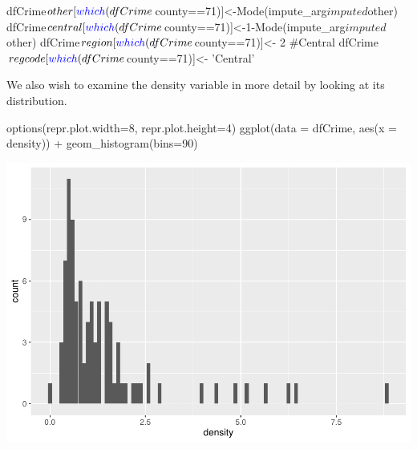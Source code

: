 \documentclass[]{article}
\newenvironment{Shaded}{}{}
\newcommand{\CommentTok}[1]{\textcolor[rgb]{0.00,0.50,0.00}{#1}}
\newcommand{\DataTypeTok}[1]{#1}
\newcommand{\DecValTok}[1]{#1}
\newcommand{\KeywordTok}[1]{\textcolor[rgb]{0.00,0.00,1.00}{#1}}
\newcommand{\NormalTok}[1]{#1}
\newcommand{\OperatorTok}[1]{#1}
\newcommand{\StringTok}[1]{\textcolor[rgb]{0.00,0.50,0.50}{#1}}
\begin{document}
\begin{Shaded}
\begin{Highlighting}[]
\NormalTok{dfCrime}\OperatorTok{$}\NormalTok{other[}\KeywordTok{which}\NormalTok{(dfCrime}\OperatorTok{$}\NormalTok{county}\OperatorTok{==}\DecValTok{71}\NormalTok{)]<-}\KeywordTok{Mode}\NormalTok{(impute_arg}\OperatorTok{$}\NormalTok{imputed}\OperatorTok{$}\NormalTok{other)}
\NormalTok{dfCrime}\OperatorTok{$}\NormalTok{central[}\KeywordTok{which}\NormalTok{(dfCrime}\OperatorTok{$}\NormalTok{county}\OperatorTok{==}\DecValTok{71}\NormalTok{)]<-}\DecValTok{1}\OperatorTok{-}\KeywordTok{Mode}\NormalTok{(impute_arg}\OperatorTok{$}\NormalTok{imputed}\OperatorTok{$}\NormalTok{other)}
\NormalTok{dfCrime}\OperatorTok{$}\NormalTok{region[}\KeywordTok{which}\NormalTok{(dfCrime}\OperatorTok{$}\NormalTok{county}\OperatorTok{==}\DecValTok{71}\NormalTok{)]<-}\StringTok{ }\DecValTok{2} \CommentTok{#Central}
\NormalTok{dfCrime}\OperatorTok{$}\NormalTok{regcode[}\KeywordTok{which}\NormalTok{(dfCrime}\OperatorTok{$}\NormalTok{county}\OperatorTok{==}\DecValTok{71}\NormalTok{)]<-}\StringTok{ 'Central'}
\end{Highlighting}
\end{Shaded}

We also wish to examine the density variable in more detail by looking
at its distribution.

\begin{Shaded}
\begin{Highlighting}[]
\KeywordTok{options}\NormalTok{(}\DataTypeTok{repr.plot.width=}\DecValTok{8}\NormalTok{, }\DataTypeTok{repr.plot.height=}\DecValTok{4}\NormalTok{)}
\KeywordTok{ggplot}\NormalTok{(}\DataTypeTok{data =}\NormalTok{ dfCrime, }\KeywordTok{aes}\NormalTok{(}\DataTypeTok{x =}\NormalTok{ density)) }\OperatorTok{+}
\StringTok{      }\KeywordTok{geom_histogram}\NormalTok{(}\DataTypeTok{bins=}\DecValTok{90}\NormalTok{)}
\end{Highlighting}
\end{Shaded}

\includegraphics{Bagnard_Gaustad_Hartman_Leung_Lab_3_files/figure-latex/unnamed-chunk-37-1.pdf}
\end{document}
